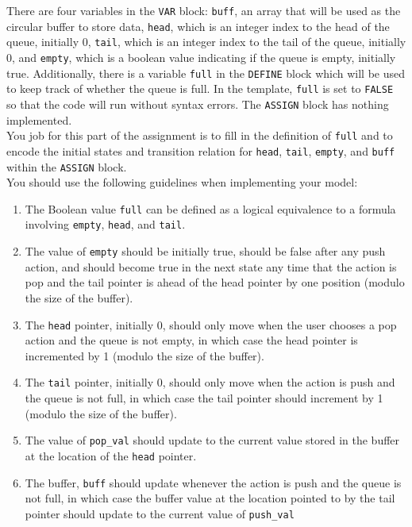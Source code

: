 \documentclass[12pt]{article}
\newenvironment{problem}[2][Problem]{\begin{trivlist}
\item[\hskip \labelsep {\bfseries #1}\hskip \labelsep {\bfseries #2.}]}{\end{trivlist}}
\begin{document}
\begin{problem}{1. A model of a queue}
There are four variables in the \texttt{VAR} block: 
\texttt{buff}, an array that will be used as the circular buffer to store data,
\texttt{head}, which is an integer index to the head of the queue, initially 0,
\texttt{tail}, which is an integer index to the tail of the queue, initially 0, and
\texttt{empty}, which is a boolean value indicating if the queue is empty, initially true. Additionally, there is a variable \texttt{full} in the \texttt{DEFINE} block which will be used to keep track of whether the queue is full. In the template, \texttt{full} is set to \texttt{FALSE} so that the code will run without syntax errors. The \texttt{ASSIGN} block has nothing implemented. \\

You job for this part of the assignment is to fill in the definition of \texttt{full} and to encode the initial states and transition relation for
\texttt{head}, 
\texttt{tail}, 
\texttt{empty}, and 
\texttt{buff} within the \texttt{ASSIGN} block. \\ 

You should use the following guidelines when implementing your model:

\begin{enumerate}[label=\roman*.]

\item The Boolean value \texttt{full} can be defined as a logical equivalence to a formula involving \texttt{empty}, \texttt{head}, and \texttt{tail}.


\item The value of \texttt{empty} should be initially true, should be false after any push action, and should become true in the next state any time that the action is pop and the tail pointer is ahead of the head pointer by one position (modulo the size of the buffer). 

\item The \texttt{head} pointer, initially 0, should only move when the user chooses a pop action and the queue is not empty, in which case the head pointer is incremented by 1 (modulo the size of the buffer). 

\item The \texttt{tail} pointer, initially 0, should only move when the action is push and the queue is not full, in which case the tail pointer should increment by 1 (modulo the size of the buffer). 

\item The value of \texttt{pop\_val} should update to the current value stored in the buffer at the location of the \texttt{head} pointer.

\item The buffer, \texttt{buff} should update whenever the action is push and the queue is not full, in which case the buffer value at the location pointed to by the tail pointer should update to the current value of \texttt{push\_val} 


\end{enumerate}


\end{problem}
\end{document}
